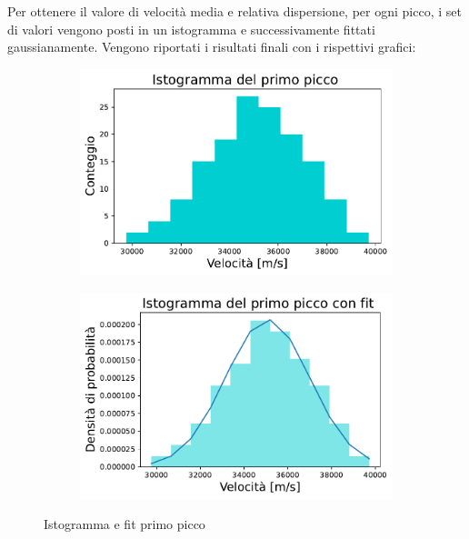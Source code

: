 Per ottenere il valore di velocità media e relativa dispersione, per ogni picco, i set di valori vengono posti in un istogramma e successivamente fittati gaussianamente. Vengono riportati i risultati finali con i rispettivi grafici:

	

\begin{figure}[H]
\centering

\begin{subfigure}[h!]{0.49\textwidth}
	\includegraphics[width=\textwidth]{Primo_histo.pdf}
    \label{fig:sub1}
\end{subfigure}
\hfill
\begin{subfigure}[h!]{0.49\textwidth}
    \includegraphics[width=\textwidth]{Primo_histo_fit.pdf}
    \label{fig:sub2}
\end{subfigure}
\caption{Istogramma e fit primo picco}
\end{figure}


